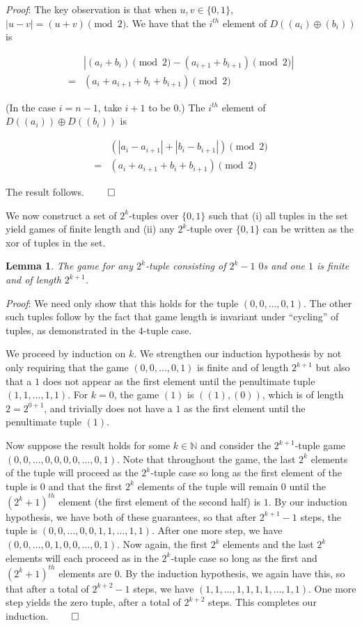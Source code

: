 \documentclass[12pt]{amsart}
\newtheorem{lemma}[theorem]{Lemma}
\newcommand{\xor}{\oplus}
\newcommand{\znn}{\mathbb{N}}
\begin{document}
\textit{Proof}: The key observation is that when $u,v\in \{0,1\}$, $|u-v|=(u+v)\pmod{2}$. We have that the $i^{th}$ element of $D((a_i)\xor (b_i))$ is

$$\begin{array}{cl}
& |(a_i+b_i)\pmod{2} - (a_{i+1}+b_{i+1})\pmod{2}| \\
= & (a_i+a_{i+1}+b_i+b_{i+1})\pmod{2}
\end{array}$$

(In the case $i=n-1$, take $i+1$ to be $0$.) The $i^{th}$ element of $D((a_i))\xor D((b_i))$ is

$$\begin{array}{cl}
& (|a_i-a_{i+1}|+|b_i-b_{i+1}|)\pmod{2} \\
= & (a_i+a_{i+1}+b_i+b_{i+1})\pmod{2}
\end{array}$$

The result follows. $\qed$

We now construct a set of $2^k$-tuples over $\{0,1\}$ such that (i) all tuples in the set yield games of finite length and (ii) any $2^k$-tuple over $\{0,1\}$ can be written as the xor of tuples in the set.

\begin{lemma}
The game for any $2^k$-tuple consisting of $2^k-1$ $0$s and one $1$ is finite and of length $2^{k+1}$.
\end{lemma}

\textit{Proof}: We need only show that this holds for the tuple $(0,0,\ldots,0,1)$. The other such tuples follow by the fact that game length is invariant under ``cycling'' of tuples, as demonstrated in the $4$-tuple case.

We proceed by induction on $k$. We strengthen our induction hypothesis by not only requiring that the game $(0,0,\ldots,0,1)$ is finite and of length $2^{k+1}$ but also that a $1$ does not appear as the first element until the penultimate tuple $(1,1,\ldots,1,1)$. For $k=0$, the game $(1)$ is $((1),(0))$, which is of length $2=2^{0+1}$, and trivially does not have a $1$ as the first element  until the penultimate tuple $(1)$.

Now suppose the result holds for some $k\in \znn$ and consider the $2^{k+1}$-tuple game $(0,0,\ldots,0,0,0,0,\ldots,0,1)$. Note that throughout the game, the last $2^k$ elements of the tuple will proceed as the $2^k$-tuple case so long as the first element of the tuple is $0$ and that the first $2^k$ elements of the tuple will remain $0$ until the $(2^k+1)^{th}$ element (the first element of the second half) is $1$. By our induction hypothesis, we have both of these guarantees, so that after $2^{k+1}-1$ steps, the tuple is $(0,0,\ldots,0,0,1,1,\ldots,1,1)$. After one more step, we have $(0,0,\ldots,0,1,0,0,\ldots,0,1)$. Now again, the first $2^k$ elements and the last $2^k$ elements will each proceed as in the $2^k$-tuple case so long as the first and $(2^k+1)^{th}$ elements are $0$. By the induction hypothesis, we again have this, so that after a total of $2^{k+2}-1$ steps, we have $(1,1,\ldots,1,1,1,1,\ldots,1,1)$. One more step yields the zero tuple, after a total of $2^{k+2}$ steps. This completes our induction. $\qed$
\end{document}
